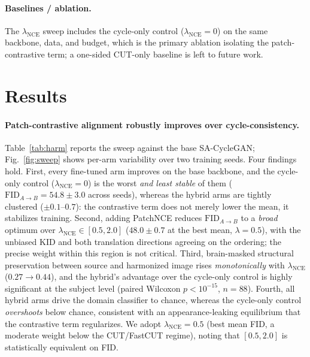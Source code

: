 \documentclass[runningheads]{llncs}
\begin{document}
\paragraph{Baselines / ablation.}
The $\lambda_{\mathrm{NCE}}$ sweep includes the cycle-only control
($\lambda_{\mathrm{NCE}}{=}0$) on the same backbone, data, and budget, which is the
primary ablation isolating the patch-contrastive term; a one-sided CUT-only
baseline is left to future work.

\section{Results}
\label{sec:results}
\paragraph{Patch-contrastive alignment robustly improves over cycle-consistency.}
Table~\ref{tab:harm} reports the sweep against the base SA-CycleGAN;
Fig.~\ref{fig:sweep} shows per-arm variability over two training seeds. Four
findings hold. First, every fine-tuned arm improves on the base backbone, and the
cycle-only control ($\lambda_{\mathrm{NCE}}{=}0$) is the worst \emph{and least
stable} of them ($\mathrm{FID}_{A\to B}{=}54.8{\pm}3.0$ across seeds), whereas the
hybrid arms are tightly clustered ($\pm0.1$--$0.7$): the contrastive term does not
merely lower the mean, it stabilizes training. Second, adding PatchNCE reduces
$\mathrm{FID}_{A\to B}$ to a \emph{broad} optimum over
$\lambda_{\mathrm{NCE}}\!\in\![0.5,2.0]$ ($48.0{\pm}0.7$ at the best mean,
$\lambda{=}0.5$), with the unbiased KID and both translation directions agreeing
on the ordering; the precise weight within this region is not critical. Third,
brain-masked structural preservation between source and harmonized image rises
\emph{monotonically} with $\lambda_{\mathrm{NCE}}$ ($0.27\!\to\!0.44$), and the
hybrid's advantage over the cycle-only control is highly significant at the
subject level (paired Wilcoxon $p{<}10^{-15}$, $n{=}88$). Fourth, all hybrid arms
drive the domain classifier to chance, whereas the cycle-only control
\emph{overshoots} below chance, consistent with an appearance-leaking equilibrium
that the contrastive term regularizes. We adopt $\lambda_{\mathrm{NCE}}{=}0.5$
(best mean FID, a moderate weight below the CUT/FastCUT regime), noting that
$[0.5,2.0]$ is statistically equivalent on FID.
\end{document}
